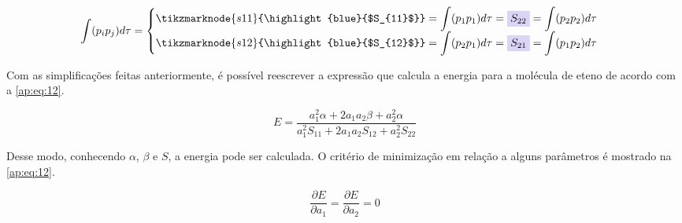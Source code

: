 \begin{figure}[htb]
    \vspace{2\baselineskip}
\begin{equation}
\label{ap:eq:10}
\displaystyle \int (p_i p_j) d\tau =
\begin{cases}
 \tikzmarknode{s11}{\highlight{blue}{$S_{11}$}} = \displaystyle \int (p_1 p_1) d\tau = \highlight{blue}{$S_{22}$} = \displaystyle \int (p_2 p_2) d\tau \\
 \tikzmarknode{s12}{\highlight{blue}{$S_{12}$}} = \displaystyle \int (p_2 p_1) d\tau = \highlight{blue}{$S_{21}$} = \displaystyle \int (p_1 p_2) d\tau
\end{cases}
\end{equation}
\end{figure}

Com as simplificações feitas anteriormente, é possível reescrever a expressão que calcula a energia para a molécula de eteno de acordo com a \autoref{ap:eq:12}.

\begin{figure}[htb]
    \vspace{2\baselineskip}
\begin{equation}
\label{ap:eq:12}
    E = \frac{a_1^2 \alpha + 2a_1 a_2 \beta + a_2^2 \alpha}{a_1^2 S_{11} + 2a_1 a_2 S_{12} + a_2^2 S_{22}}
\end{equation}
\end{figure}

Desse modo, conhecendo $\alpha$, $\beta$ e $S$, a energia pode ser calculada. O critério de minimização em relação a alguns parâmetros é mostrado na \autoref{ap:eq:12}.

\begin{figure}[htb]
    \vspace{2\baselineskip}
\begin{equation}
\label{ap:eq:13}
    \frac{\partial E}{\partial a_1} = \frac{\partial E}{\partial a_2} = 0
\end{equation}
\end{figure}

